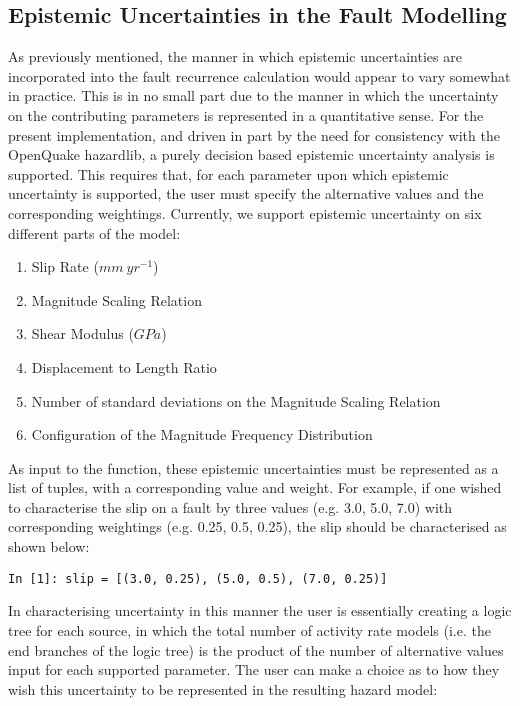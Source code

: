\subsection{Epistemic Uncertainties in the Fault Modelling}

As previously mentioned, the manner in which epistemic uncertainties are incorporated into the fault recurrence calculation would appear to vary somewhat in practice. This is in no small part due to the manner in which the uncertainty on the contributing parameters is represented in a quantitative sense. For the present implementation, and driven in part by the need for consistency with the OpenQuake hazardlib, a purely decision based epistemic uncertainty analysis is supported. This requires that, for each parameter upon which epistemic uncertainty is supported, the user must specify the alternative values and the corresponding weightings. Currently, we support epistemic uncertainty on six different parts of the model:

\begin{enumerate}
\item Slip Rate ($mm\ yr^{-1}$)

\item Magnitude Scaling Relation

\item Shear Modulus ($GPa$)

\item Displacement to Length Ratio

\item Number of standard deviations on the Magnitude Scaling Relation

\item Configuration of the Magnitude Frequency Distribution
\end{enumerate}

As input to the function, these epistemic uncertainties must be represented as a list of tuples, with a corresponding value and weight. For example, if one wished to characterise the slip on a fault by three values (e.g. 3.0, 5.0, 7.0) with corresponding weightings (e.g. 0.25, 0.5, 0.25), the slip should be characterised as shown below: 

\begin{Verbatim}[frame=single, commandchars=\\\{\}, fontsize=\scriptsize]
In [1]: slip = [(3.0, 0.25), (5.0, 0.5), (7.0, 0.25)]
\end{Verbatim}

In characterising uncertainty in this manner the user is essentially creating a logic tree for each source, in which the total number of activity rate models (i.e. the end branches of the logic tree) is the product of the number of alternative values input for each supported parameter. The user can make a choice as to how they wish this uncertainty to be represented in the resulting hazard model:


